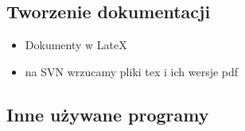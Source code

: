 \documentclass[a4paper,10pt,twoside]{article}
\begin{document}
\subsection{Tworzenie dokumentacji}
\begin{itemize}
 	\item Dokumenty w LateX
	\item na SVN wrzucamy pliki tex i ich wersje pdf
\end{itemize}


\subsection{Inne używane programy}
\end{document}
